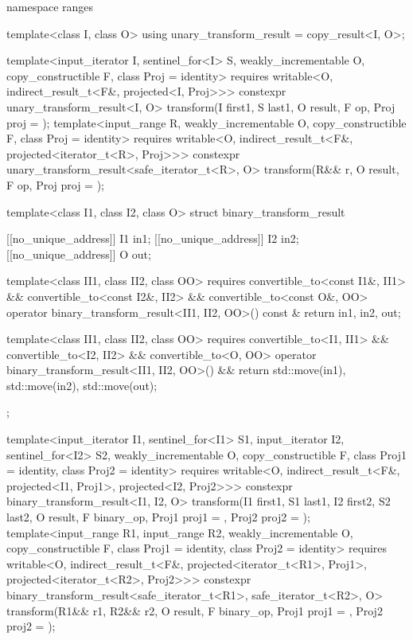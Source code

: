 \begin{codeblock}
{  namespace ranges {
    template<class I, class O>
    using unary_transform_result = copy_result<I, O>;

    template<input_iterator I, sentinel_for<I> S, weakly_incrementable O,
             copy_constructible F, class Proj = identity>
      requires writable<O, indirect_result_t<F&, projected<I, Proj>>>
      constexpr unary_transform_result<I, O>
        transform(I first1, S last1, O result, F op, Proj proj = {});
    template<input_range R, weakly_incrementable O, copy_constructible F,
             class Proj = identity>
      requires writable<O, indirect_result_t<F&, projected<iterator_t<R>, Proj>>>
      constexpr unary_transform_result<safe_iterator_t<R>, O>
        transform(R&& r, O result, F op, Proj proj = {});

    template<class I1, class I2, class O>
    struct binary_transform_result {
      [[no_unique_address]] I1 in1;
      [[no_unique_address]] I2 in2;
      [[no_unique_address]] O  out;

      template<class II1, class II2, class OO>
        requires convertible_to<const I1&, II1> &&
          convertible_to<const I2&, II2> && convertible_to<const O&, OO>
        operator binary_transform_result<II1, II2, OO>() const & {
          return {in1, in2, out};
        }

      template<class II1, class II2, class OO>
        requires convertible_to<I1, II1> &&
          convertible_to<I2, II2> && convertible_to<O, OO>
        operator binary_transform_result<II1, II2, OO>() && {
          return {std::move(in1), std::move(in2), std::move(out)};
        }
    };

    template<input_iterator I1, sentinel_for<I1> S1, input_iterator I2, sentinel_for<I2> S2,
             weakly_incrementable O, copy_constructible F, class Proj1 = identity,
             class Proj2 = identity>
      requires writable<O, indirect_result_t<F&, projected<I1, Proj1>,
                                             projected<I2, Proj2>>>
      constexpr binary_transform_result<I1, I2, O>
        transform(I1 first1, S1 last1, I2 first2, S2 last2, O result,
                  F binary_op, Proj1 proj1 = {}, Proj2 proj2 = {});
    template<input_range R1, input_range R2, weakly_incrementable O,
             copy_constructible F, class Proj1 = identity, class Proj2 = identity>
      requires writable<O, indirect_result_t<F&, projected<iterator_t<R1>, Proj1>,
                                             projected<iterator_t<R2>, Proj2>>>
      constexpr binary_transform_result<safe_iterator_t<R1>, safe_iterator_t<R2>, O>
        transform(R1&& r1, R2&& r2, O result,
                  F binary_op, Proj1 proj1 = {}, Proj2 proj2 = {});
  }

}
\end{codeblock}

